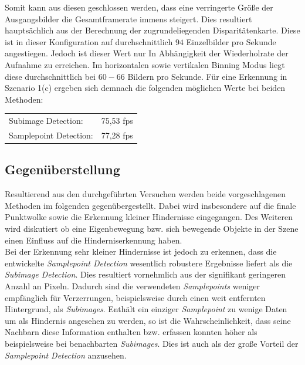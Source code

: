\pagebreak
\noindent
Somit kann aus diesen geschlossen werden, dass eine verringerte Größe der Ausgangsbilder die Gesamtframerate immens steigert. Dies resultiert hauptsächlich aus der Berechnung der zugrundeliegenden Disparitätenkarte. Diese ist in dieser Konfiguration auf durchschnittlich $94$ Einzelbilder pro Sekunde angestiegen. Jedoch ist dieser Wert nur In Abhängigkeit der Wiederholrate der Aufnahme zu erreichen. Im horizontalen sowie vertikalen Binning Modus liegt diese durchschnittlich bei $60 - 66$ Bildern pro Sekunde. Für eine Erkennung in Szenario 1(c) ergeben sich demnach die folgenden möglichen Werte bei beiden Methoden:

\begin{table}[h]
\centering
\begin{tabular}{ll}
Subimage Detection:    & 75,53 fps\\
Samplepoint Detection: & 77,28 fps
\end{tabular}
\end{table}


\subsection{Gegenüberstellung}
\label{sec:gegenueberstellung}

Resultierend aus den durchgeführten Versuchen werden beide vorgeschlagenen Methoden im folgenden gegenübergestellt. Dabei wird insbesondere auf die finale Punktwolke sowie die Erkennung kleiner Hindernisse eingegangen. Des Weiteren wird diskutiert ob eine Eigenbewegung bzw. sich bewegende Objekte in der Szene einen Einfluss auf die Hinderniserkennung haben.\\

\noindent
Bei der Erkennung sehr kleiner Hindernisse ist jedoch zu erkennen, dass die entwickelte \textit{Samplepoint Detection} wesentlich robustere Ergebnisse liefert als die \textit{Subimage Detection}. Dies resultiert vornehmlich aus der signifikant geringeren Anzahl an Pixeln. Dadurch sind die verwendeten \emph{Samplepoints} weniger empfänglich für Verzerrungen, beispielsweise durch einen weit entfernten Hintergrund, als \emph{Subimages}. Enthält ein einziger \textit{Samplepoint} zu wenige Daten um als Hindernis angesehen zu werden, so ist die Wahrscheinlichkeit, dass seine Nachbarn diese Information enthalten bzw. erfassen konnten höher als beispielsweise bei benachbarten \textit{Subimages}. Dies ist auch als der große Vorteil der \textit{Samplepoint Detection} anzusehen.\\

